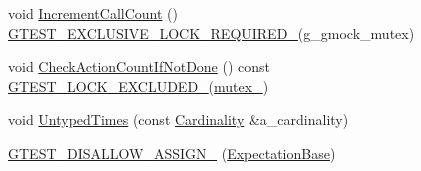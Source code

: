 \begin{DoxyCompactItemize}
\item 
void \hyperlink{classtesting_1_1internal_1_1ExpectationBase_aef1766c39ad6478f9041e0f5c5000532}{Increment\+Call\+Count} () \hyperlink{gtest-port_8h_a149f693bd59fa1bc937af54c0cdcb32f}{G\+T\+E\+S\+T\+\_\+\+E\+X\+C\+L\+U\+S\+I\+V\+E\+\_\+\+L\+O\+C\+K\+\_\+\+R\+E\+Q\+U\+I\+R\+E\+D\+\_\+}(g\+\_\+gmock\+\_\+mutex)
\item 
void \hyperlink{classtesting_1_1internal_1_1ExpectationBase_aaeb143b6f8676e9a6fb9b17678344f03}{Check\+Action\+Count\+If\+Not\+Done} () const \hyperlink{gtest-port_8h_a69abff5a4efdd07bd5faebe3dd318d06}{G\+T\+E\+S\+T\+\_\+\+L\+O\+C\+K\+\_\+\+E\+X\+C\+L\+U\+D\+E\+D\+\_\+}(\hyperlink{classtesting_1_1internal_1_1ExpectationBase_a364f5473591d08d0ac03595c9050c13e}{mutex\+\_\+})
\item 
void \hyperlink{classtesting_1_1internal_1_1ExpectationBase_a05bbd7fea6ea3c740ea095ea7462bc07}{Untyped\+Times} (const \hyperlink{classtesting_1_1Cardinality}{Cardinality} \&a\+\_\+cardinality)
\item 
\hyperlink{classtesting_1_1internal_1_1ExpectationBase_a9a28e2f508571a0d68d9f964f3634022}{G\+T\+E\+S\+T\+\_\+\+D\+I\+S\+A\+L\+L\+O\+W\+\_\+\+A\+S\+S\+I\+G\+N\+\_\+} (\hyperlink{classtesting_1_1internal_1_1ExpectationBase}{Expectation\+Base})
\end{DoxyCompactItemize}
